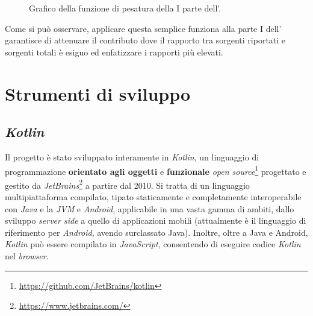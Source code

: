 \begin{figure}[h!]
	\centering
	\caption{Grafico della funzione di pesatura della I parte dell'.}
	\label{graph:weight-function}
\end{figure}

Come si può osservare, applicare questa semplice funziona alla parte I dell' garantisce di attenuare il contributo dove il rapporto tra sorgenti riportati e sorgenti totali è esiguo ed enfatizzare i rapporti più elevati. 


\section{Strumenti di sviluppo}

\subsection*{\textit{Kotlin}}
Il progetto è stato sviluppato interamente in \textit{Kotlin}, un linguaggio di programmazione \textbf{orientato agli oggetti} e \textbf{funzionale} \textit{open source}\footnote{\url{https://github.com/JetBrains/kotlin}} progettato e gestito da \textit{JetBrains}\footnote{\url{https://www.jetbrains.com/}} a partire dal 2010.
%
Si tratta di un linguaggio multipiattaforma compilato, tipato staticamente e  completamente interoperabile con \textit{Java} e la \textit{JVM} e \textit{Android}, applicabile in una vasta gamma di ambiti, dallo sviluppo \textit{server side} a quello di applicazioni mobili (attualmente è il linguaggio di riferimento per \textit{Android}, avendo surclassato Java).
%
Inoltre, oltre a Java e Android, \textit{Kotlin} può essere compilato in \textit{JavaScript}, consentendo di eseguire codice \textit{Kotlin} nel \textit{browser}.

